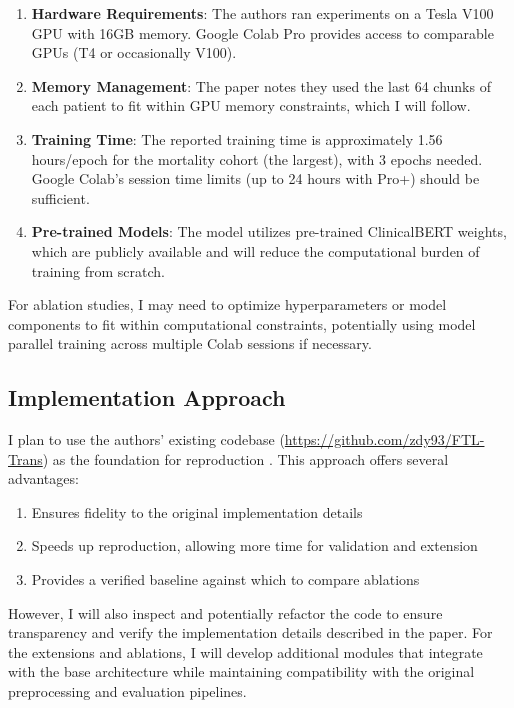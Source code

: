\documentclass[10pt,letterpaper,twocolumn]{article}
\begin{document}
\begin{enumerate}[leftmargin=*]
    \item \textbf{Hardware Requirements}: The authors ran experiments on a Tesla V100 GPU with 16GB memory. Google Colab Pro provides access to comparable GPUs (T4 or occasionally V100).
    
    \item \textbf{Memory Management}: The paper notes they used the last 64 chunks of each patient to fit within GPU memory constraints, which I will follow.
    
    \item \textbf{Training Time}: The reported training time is approximately 1.56 hours/epoch for the mortality cohort (the largest), with 3 epochs needed. Google Colab's session time limits (up to 24 hours with Pro+) should be sufficient.
    
    \item \textbf{Pre-trained Models}: The model utilizes pre-trained ClinicalBERT \cite{huang2019clinicalbert} weights, which are publicly available and will reduce the computational burden of training from scratch.
\end{enumerate}

For ablation studies, I may need to optimize hyperparameters or model components to fit within computational constraints, potentially using model parallel training across multiple Colab sessions if necessary.

\subsection{Implementation Approach}

I plan to use the authors' existing codebase (\url{https://github.com/zdy93/FTL-Trans}) as the foundation for reproduction \cite{zhang2020time}. This approach offers several advantages:

\begin{enumerate}[leftmargin=*]
    \item Ensures fidelity to the original implementation details
    \item Speeds up reproduction, allowing more time for validation and extension
    \item Provides a verified baseline against which to compare ablations
\end{enumerate}

However, I will also inspect and potentially refactor the code to ensure transparency and verify the implementation details described in the paper. For the extensions and ablations, I will develop additional modules that integrate with the base architecture while maintaining compatibility with the original preprocessing and evaluation pipelines.



\end{document}
